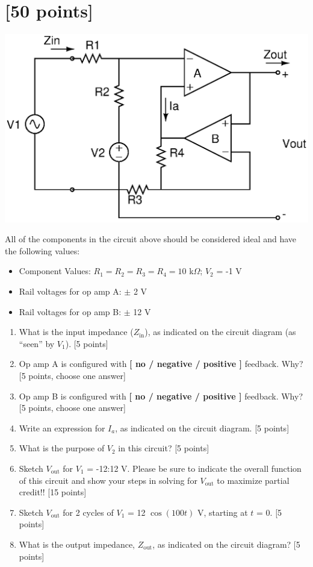 

\section{[50 points]}

\begin{center}
\includegraphics[width=0.75\linewidth]{comparator/comparator.eps}
\end{center}

All of the components in the circuit above should be considered ideal and have the following values:
\begin{itemize}
	\item Component Values: $R_1 = R_2 = R_3 = R_4 = 10$ k$\Omega$; $V_2$ = -1 V
	\item Rail voltages for op amp A: $\pm$ 2 V
	\item Rail voltages for op amp B: $\pm$ 12 V
\end{itemize}

\begin{enumerate}
	\item What is the input impedance ($Z_\textrm{in}$), as indicated on the circuit diagram (as ``seen'' by $V_1$). [5 points]
	\item Op amp A is configured with {\bf [ no / negative / positive ]} feedback. Why? [5 points, choose one answer]
	\item Op amp B is configured with {\bf [ no / negative / positive ]} feedback. Why? [5 points, choose one answer]
        \item Write an expression for $I_a$, as indicated on the circuit diagram. [5 points]
        \item What is the purpose of $V_2$ in this circuit? [5 points]
	\item Sketch $V_\textrm{out}$ for $V_1$ = -12:12 V.  Please be sure to indicate the overall function of this circuit and show your steps in solving for $V_\textrm{out}$ to maximize partial credit!! [15 points]
	\item Sketch $V_\textrm{out}$ for 2 cycles of $V_1$ = 12 $\cos(100t)$ V, starting at $t$ = 0. [5 points]
	\item What is the output impedance, $Z_\textrm{out}$, as indicated on the circuit diagram? [5 points]
\end{enumerate}
